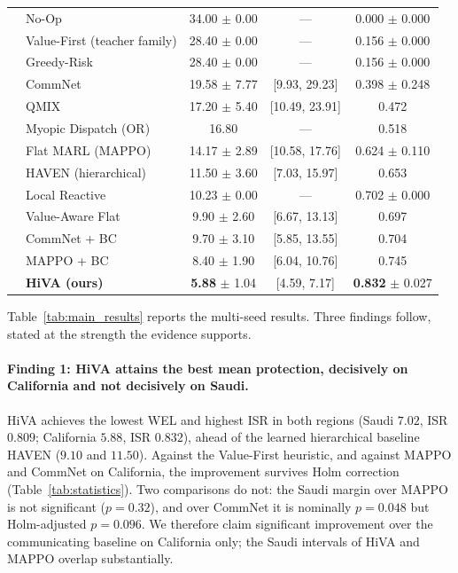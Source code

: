 \documentclass[letterpaper]{article}
\begin{document}
\begin{table}[t]
\begin{tabular}{llccc}
	& No-Op & 34.00 $\pm$ 0.00 & --- & 0.000 $\pm$ 0.000 \\
	& Value-First (teacher family) & 28.40 $\pm$ 0.00 & --- & 0.156 $\pm$ 0.000 \\
	& Greedy-Risk & 28.40 $\pm$ 0.00 & --- & 0.156 $\pm$ 0.000 \\
	& CommNet & 19.58 $\pm$ 7.77 & [9.93, 29.23] & 0.398 $\pm$ 0.248 \\
	& QMIX & 17.20 $\pm$ 5.40 & [10.49, 23.91] & 0.472 \\
	& Myopic Dispatch (OR) & 16.80 & --- & 0.518 \\
	& Flat MARL (MAPPO) & 14.17 $\pm$ 2.89 & [10.58, 17.76] & 0.624 $\pm$ 0.110 \\
	& HAVEN (hierarchical) & 11.50 $\pm$ 3.60 & [7.03, 15.97] & 0.653 \\
	& Local Reactive & 10.23 $\pm$ 0.00 & --- & 0.702 $\pm$ 0.000 \\
	& Value-Aware Flat & 9.90 $\pm$ 2.60 & [6.67, 13.13] & 0.697 \\
	& CommNet + BC & 9.70 $\pm$ 3.10 & [5.85, 13.55] & 0.704 \\
	& MAPPO + BC & 8.40 $\pm$ 1.90 & [6.04, 10.76] & 0.745 \\
	& \textbf{HiVA (ours)} & \textbf{5.88} $\pm$ 1.04 & [4.59, 7.17] & \textbf{0.832} $\pm$ 0.027 \\
	\bottomrule
\end{tabular}
\end{table}

Table~\ref{tab:main_results} reports the multi-seed results. Three findings follow, stated at the strength the evidence supports.

\paragraph{Finding 1: HiVA attains the best mean protection, decisively on California and not decisively on Saudi.} HiVA achieves the lowest WEL and highest ISR in both regions (Saudi $7.02$, ISR $0.809$; California $5.88$, ISR $0.832$), ahead of the learned hierarchical baseline HAVEN ($9.10$ and $11.50$). Against the Value-First heuristic, and against MAPPO and CommNet on California, the improvement survives Holm correction (Table~\ref{tab:statistics}). Two comparisons do not: the Saudi margin over MAPPO is not significant ($p=0.32$), and over CommNet it is nominally $p=0.048$ but Holm-adjusted $p=0.096$. We therefore claim significant improvement over the communicating baseline on California only; the Saudi intervals of HiVA and MAPPO overlap substantially.
\end{document}

